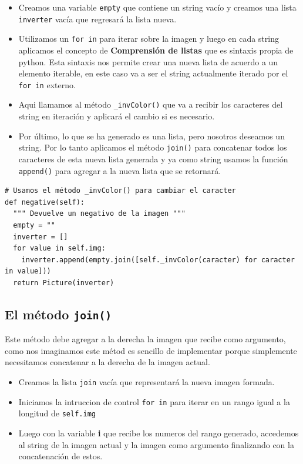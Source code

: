 \documentclass[10pt, a4paper]{article}
\newcommand{\mintpython}[1]{\texttt{#1}}
\begin{document}
\begin{itemize}
  \item Creamos una variable \mintpython{empty} que contiene un string vacío y creamos una lista \mintpython{inverter} vacía que regresará la lista nueva.
  \item Utilizamos un \mintpython{for in} para iterar sobre la imagen y luego en cada string aplicamos el concepto de \textbf{Comprensión de listas} que es sintaxis propia de python. Esta sintaxis nos permite crear una nueva lista de acuerdo a un elemento iterable, en este caso va a ser el string actualmente iterado por el \mintpython{for in} externo.
  \item Aqui llamamos al método \mintpython{\_invColor()} que va a recibir los caracteres del string en iteración y aplicará el cambio si es necesario.
  \item Por último, lo que se ha generado es una lista, pero nosotros deseamos un string. Por lo tanto aplicamos el método \mintpython{join()} para concatenar todos los caracteres de esta nueva lista generada y ya como string usamos la función \mintpython{append()} para agregar a la nueva lista que se retornará.
\end{itemize}

\begin{verbatim}
# Usamos el método _invColor() para cambiar el caracter
def negative(self):
  """ Devuelve un negativo de la imagen """
  empty = ""
  inverter = []
  for value in self.img:
    inverter.append(empty.join([self._invColor(caracter) for caracter in value]))
  return Picture(inverter)
\end{verbatim}

\subsection{El método \mintpython{join()}}
Este método debe agregar a la derecha la imagen que recibe como argumento, como nos imaginamos este métod es sencillo de implementar porque simplemente necesitamos concatenar a la derecha de la imagen actual.

\begin{itemize}
  \item Creamos la lista \mintpython{join} vacía que representará la nueva imagen formada.
  \item Iniciamos la intruccion de control \mintpython{for in} para iterar en un rango igual a la longitud de \mintpython{self.img}
  \item Luego con la variable \textbf{i} que recibe los numeros del rango generado, accedemos al string de la imagen actual y la imagen como argumento finalizando con la concatenación de estos.
\end{itemize}
\end{document}
